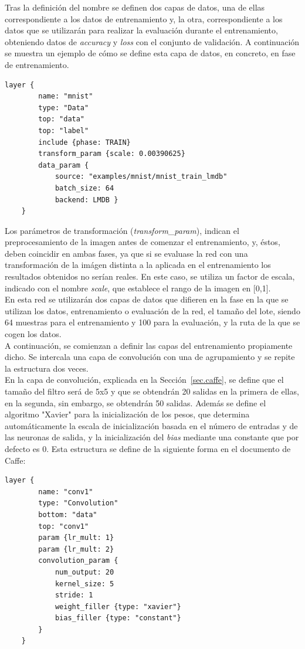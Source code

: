 	Tras la definición del nombre se definen dos capas de datos, una de ellas correspondiente a los datos de entrenamiento y, la otra, correspondiente a los datos que se utilizarán para realizar la evaluación durante el entrenamiento, obteniendo datos de \textit{accuracy} y \textit{loss} con el conjunto de validación. A continuación se muestra un ejemplo de cómo se define esta capa de datos, en concreto, en fase de entrenamiento.
	\vspace{10pt}
	\begin{lstlisting}[frame=single]
	layer {
		name: "mnist"
		type: "Data"
		top: "data"
		top: "label"
		include {phase: TRAIN}
		transform_param {scale: 0.00390625}
		data_param {
			source: "examples/mnist/mnist_train_lmdb"
			batch_size: 64
			backend: LMDB }
	}
	\end{lstlisting}
	
	Los parámetros de transformación (\textit{transform\_param}), indican el preprocesamiento de la imagen antes de comenzar el entrenamiento, y, éstos, deben coincidir en ambas fases, ya que si se evaluase la red con una transformación de la imágen distinta a la aplicada en el entrenamiento los resultados obtenidos no serían reales. En este caso, se utiliza un factor de escala, indicado con el nombre \textit{scale}, que establece el rango de la imagen en [0,1]. \\
	En esta red se utilizarán dos capas de datos que difieren en la fase en la que se utilizan los datos, entrenamiento o evaluación de la red, el tamaño del lote, siendo 64 muestras para el entrenamiento y 100 para la evaluación, y la ruta de la que se cogen los datos.\\
	
	A continuación, se comienzan a definir las capas del entrenamiento propiamente dicho. Se intercala una capa de convolución con una de agrupamiento y se repite la estructura dos veces.\\
	
	En la capa de convolución, explicada en la Sección~\ref{sec.caffe}, se define que el tamaño del filtro será de 5x5 y que se obtendrán 20 salidas en la primera de ellas, en la segunda, sin embargo, se obtendrán 50 salidas. Además se define el algoritmo "Xavier" para la inicialización de los pesos, que determina automáticamente la escala de inicialización basada en el número de entradas y de las neuronas de salida, y la inicialización del \textit{bias} mediante una constante que por defecto es 0. Esta estructura se define de la siguiente forma en el documento de Caffe:
	\vspace{10pt}
	\begin{lstlisting}[frame=single]
	layer {
		name: "conv1"
		type: "Convolution"
		bottom: "data"
		top: "conv1"
		param {lr_mult: 1}
		param {lr_mult: 2}
		convolution_param {
			num_output: 20
			kernel_size: 5
			stride: 1
			weight_filler {type: "xavier"}
			bias_filler {type: "constant"}
		}
	}	
	\end{lstlisting}
	
